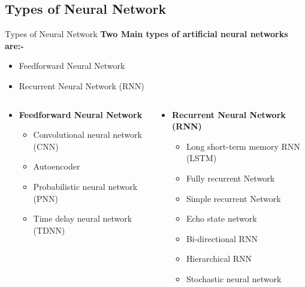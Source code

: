 \documentclass[10pt]{beamer}
\begin{document}
	\subsection{Types of Neural Network}
	\begin{frame}[t]{Types of Neural Network}
		\large{\textbf{Two Main types of artificial neural networks are:-}}
		\bigskip
		\begin{itemize}
			\item \large{Feedforward Neural Network}
			\item \large{Recurrent Neural Network (RNN)}
		\end{itemize}
		\bigskip
		\bigskip
		\begin{columns}
			\begin{column}{0.5\textwidth}
				\begin{itemize}
					\item \textbf{Feedforward Neural Network}
					\begin{itemize}
						\item Convolutional neural network (CNN)
						\item Autoencoder
						\item Probabilistic neural network (PNN)
						\item Time delay neural network (TDNN)
					\end{itemize}
				\end{itemize}
			\end{column}
			\begin{column}{0.5\textwidth}
				\begin{itemize}
					\item \textbf{Recurrent Neural Network (RNN)}
					\begin{itemize}
						\item Long short-term memory RNN (LSTM)
						\item Fully recurrent Network
						\item Simple recurrent Network
						\item Echo state network
						\item Bi-directional RNN
						\item Hierarchical RNN
						\item Stochastic neural network
					\end{itemize}
				\end{itemize}
			\end{column}
		\end{columns}
	\end{frame}
\end{document}
